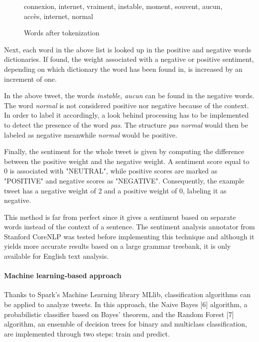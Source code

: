 \documentclass[11pt]{article}
\begin{document}
\vspace{9pt}
\begin{figure}[h!]
    \centering
    \textsf{connexion, internet, vraiment, instable, moment, souvent, aucun, accès, internet, normal}
    \caption{Words after tokenization}
    \label{tokens}
\end{figure}

Next, each word in the above list is looked up in the positive and negative words dictionaries. If found, the weight associated with a negative or positive sentiment, depending on which dictionary the word has been found in, is increased by an increment of one.

In the above tweet, the words \textit{instable, aucun} can be found in the negative words. The word \textit{normal} is not considered positive nor negative because of the context. In order to label it accordingly, a look behind processing has to be implemented to detect the presence of the word \textit{pas}. The structure \textit{pas normal} would then be labeled as negative meanwhile \textit{normal} would be positive.

Finally, the sentiment for the whole tweet is given by computing the difference between the positive weight and the negative weight. A sentiment score equal to 0 is associated with "NEUTRAL", while positive scores are marked as "POSITIVE" and negative scores as "NEGATIVE". Consequently, the example tweet has a negative weight of 2 and a positive weight of 0, labeling it as negative.

\vspace{9pt}
This method is far from perfect since it gives a sentiment based on separate words instead of the context of a sentence. The sentiment analysis annotator from \textsf{Stanford CoreNLP} was tested before implementing this technique and although it yields more accurate results based on a large grammar treebank, it is only available for English text analysis.

\paragraph{Machine learning-based approach}

Thanks to \textsf{Spark}'s Machine Learning library \textsf{MLlib}, classification algorithms can be applied to analyze tweets. In this approach, the Naive Bayes [6] algorithm, a probabilistic classifier based on Bayes' theorem, and the Random Forest [7] algorithm, an ensemble of decision trees for binary and multiclass classification, are implemented through two steps: train and predict.
\end{document}
